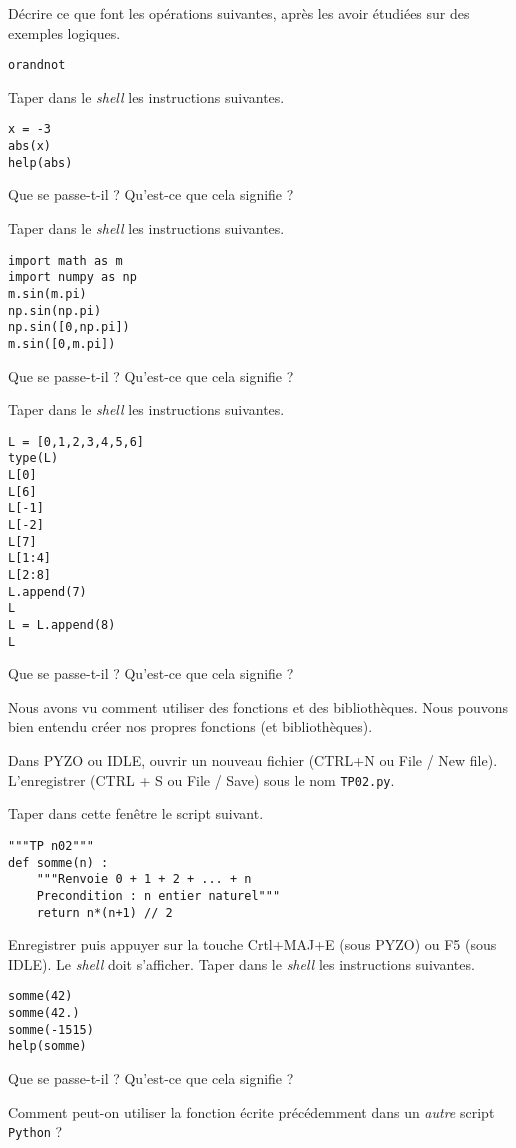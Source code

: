 \medskip{}

\question{} Décrire ce que font les opérations suivantes, après les avoir étudiées sur des exemples logiques.
\begin{center}
  \texttt{or}\qquad\texttt{and}\qquad\texttt{not}
\end{center}


\medskip{}

\question{} Taper dans le \emph{shell} les instructions suivantes. 
\begin{lstlisting}
x = -3
abs(x)
help(abs)
\end{lstlisting}
Que se passe-t-il ? Qu'est-ce que cela signifie ?

\medskip{}

\question{} Taper dans le \emph{shell} les instructions suivantes. 
\begin{lstlisting}
import math as m
import numpy as np
m.sin(m.pi)
np.sin(np.pi)
np.sin([0,np.pi])
m.sin([0,m.pi])
\end{lstlisting}
Que se passe-t-il ? Qu'est-ce que cela signifie ?


\medskip{}

\question{} Taper dans le \emph{shell} les instructions suivantes. 
\begin{lstlisting}
L = [0,1,2,3,4,5,6]
type(L)
L[0]
L[6]
L[-1]
L[-2]
L[7]
L[1:4]
L[2:8]
L.append(7)
L
L = L.append(8)
L
\end{lstlisting}
Que se passe-t-il ? Qu'est-ce que cela signifie ?

\medskip{}

Nous avons vu comment utiliser des fonctions et des bibliothèques. Nous pouvons bien entendu créer nos propres fonctions (et bibliothèques). 

Dans PYZO ou IDLE, ouvrir un nouveau fichier (CTRL+N ou File / New file). L'enregistrer (CTRL + S ou File / Save) sous le nom \texttt{TP02.py}. 

\medskip{}

\question{} Taper dans cette fenêtre le script suivant. 
\begin{lstlisting}
"""TP n02"""
def somme(n) : 
    """Renvoie 0 + 1 + 2 + ... + n
    Precondition : n entier naturel"""
    return n*(n+1) // 2 
\end{lstlisting}
Enregistrer puis appuyer sur la touche Crtl+MAJ+E (sous PYZO) ou F5 (sous IDLE).
Le \emph{shell} doit s'afficher. 
Taper dans le \emph{shell} les instructions suivantes. 
\begin{lstlisting}
somme(42)
somme(42.)
somme(-1515)
help(somme)
\end{lstlisting}
Que se passe-t-il ? Qu'est-ce que cela signifie ?

\medskip{}

\question{} Comment peut-on utiliser la fonction écrite précédemment dans un \emph{autre} script \texttt{Python}{} ? 